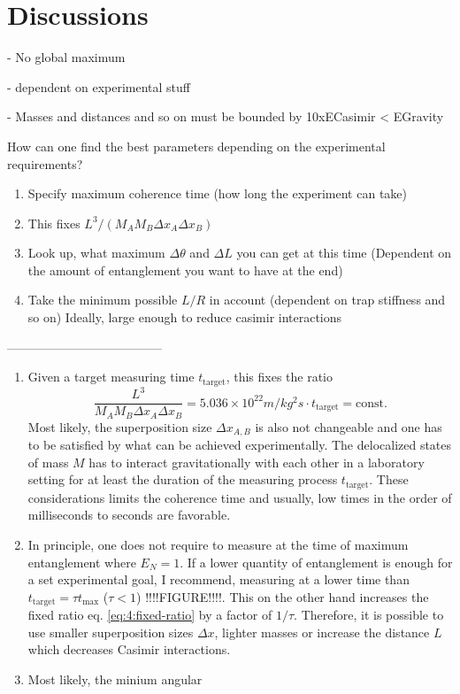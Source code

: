 \section{Discussions}\label{sec:4:discussion}

- No global maximum

- dependent on experimental stuff

- Masses and distances and so on must be bounded by 10xECasimir < EGravity

How can one find the best parameters depending on the experimental requirements?
\begin{enumerate}
  \item Specify maximum coherence time (how long the experiment can take)
  \item This fixes $L^3/(M_A M_B \Delta x_A \Delta x_B)$
  \item Look up, what maximum $\Delta \theta$ and $\Delta L$ you can get at this time (Dependent on the amount of entanglement you want to have at the end)
  \item Take the minimum possible $L/R$ in account (dependent on trap stiffness and so on) Ideally, large enough to reduce casimir interactions
\end{enumerate}


-------------------------------------- 

\begin{enumerate}
  \item Given a target measuring time $t_\mathrm{target}$, this fixes the ratio
  \begin{equation}\label{eq:4:fixed-ratio}
    \frac{L^3}{M_A M_B \Delta x_A \Delta x_B} = 5.036\times 10^{22}\si{m/kg^2s} \cdot t_\mathrm{target} = \mathrm{const.}
  \end{equation}
  Most likely, the superposition size $\Delta x_{A,B}$ is also not changeable and one has to be satisfied by what can be achieved experimentally. The delocalized states of mass $M$ has to interact gravitationally with each other in a laboratory setting for at least the duration of the measuring process $t_\mathrm{target}$. These considerations limits the coherence time and usually, low times in the order of milliseconds to seconds are favorable.
  \item In principle, one does not require to measure at the time of maximum entanglement where $E_N = 1$. If a lower quantity of entanglement is enough for a set experimental goal, I recommend, measuring at a lower time than $t_\mathrm{target} = \tau t_\mathrm{max}$ ($\tau < 1$) !!!!FIGURE!!!!. This on the other hand increases the fixed ratio eq. \eqref{eq:4:fixed-ratio} by a factor of $1/\tau$.
  Therefore, it is possible to use smaller superposition sizes $\Delta x$, lighter masses or increase the distance $L$ which decreases Casimir interactions.
  \item Most likely, the minium angular 
\end{enumerate}